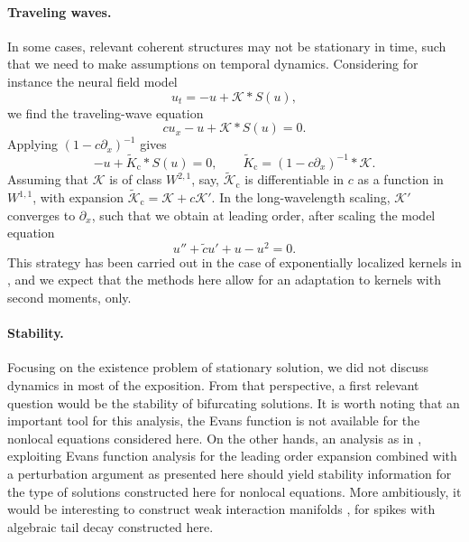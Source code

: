 \documentclass[10pt]{article}
\newcommand{\K}{\mathcal{K}}
\begin{document}
\paragraph{Traveling waves.} In some cases, relevant coherent structures may not be stationary in time, such that we need to make assumptions on temporal dynamics. Considering for instance the neural field model
\[
u_t=-u+\K*S(u),
\]
we find the traveling-wave equation 
\[
cu_x - u + \K*S(u)=0.
\]
Applying $(1-c\partial_x)^{-1}$ gives 
\[
-u+\tilde{K}_\mathrm{c}*S(u)=0,\qquad \tilde{K}_\mathrm{c}=(1-c\partial_x)^{-1}*\K.
\]
Assuming that $\K$ is of class $W^{2,1}$, say, $\tilde{\K}_\mathrm{c}$ is differentiable in $c$ as a function in $W^{1,1}$, with expansion $\tilde{\K}_\mathrm{c}=\K+c\K'$. In the long-wavelength scaling, $\K'$ converges to $\partial_x$, such that we obtain at leading order, after scaling  the model equation 
\[
u''+\tilde{c}u'+u-u^2=0.
\]
This strategy has been carried out in the case of exponentially localized kernels in \cite[\S 4.2]{FScmfd}, and we expect that the methods here allow for an adaptation to kernels with second moments, only. 


\paragraph{Stability.} Focusing on the existence problem of stationary solution, we did not discuss dynamics in most of the exposition. From that perspective, a first relevant question would be the stability of bifurcating solutions. It is worth noting that an important tool for this analysis, the Evans function \cite{evans,agj,sandtw} is not available for the nonlocal equations considered here. On the other hands, an analysis as in \cite{HS2,HS}, exploiting Evans function analysis for the leading order expansion combined with a perturbation argument as presented here should yield stability information for the type of solutions constructed here for nonlocal equations. More ambitiously, it would be interesting to construct weak interaction manifolds \cite{bz,sandtw,mz}, for spikes with algebraic tail decay constructed here. 
\end{document}
